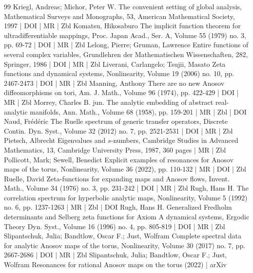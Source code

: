 \documentclass[10pt]{amsart}
\theoremstyle{definition}\newtheorem{defi}[theo]{Definition}\newtheorem{rema}[theo]{Remark}\newtheorem{exam}[theo]{Example}\newtheorem{exem}[theo]{Example}\newtheorem{nota}[theo]{Notation}
\begin{document}
\begin{thebibliography}{99}
 Kriegl, Andreas; Michor, Peter W. The convenient setting of global analysis, Mathematical Surveys and Monographs, 53, American Mathematical Society, 1997 | DOI | MR | Zbl
 Komatsu, Hikosaburo The implicit function theorem for ultradifferentiable mappings, Proc. Japan Acad., Ser. A, Volume 55 (1979) no. 3, pp. 69-72 | DOI | MR | Zbl
 Lelong, Pierre; Gruman, Lawrence Entire functions of several complex variables, Grundlehren der Mathematischen Wissenschaften, 282, Springer, 1986 | DOI | MR | Zbl
 Liverani, Carlangelo; Tsujii, Masato Zeta functions and dynamical systems, Nonlinearity, Volume 19 (2006) no. 10, pp. 2467-2473 | DOI | MR | Zbl
 Manning, Anthony There are no new Anosov diffeomorphisms on tori, Am. J. Math., Volume 96 (1974), pp. 422-429 | DOI | MR | Zbl
 Morrey, Charles B. jun. The analytic embedding of abstract real-analytic manifolds, Ann. Math., Volume 68 (1958), pp. 159-201 | MR | Zbl | DOI
 Naud, Frédéric The Ruelle spectrum of generic transfer operators, Discrete Contin. Dyn. Syst., Volume 32 (2012) no. 7, pp. 2521-2531 | DOI | MR | Zbl
 Pietsch, Albrecht Eigenvalues and $s$-numbers, Cambridge Studies in Advanced Mathematics, 13, Cambridge University Press, 1987, 360 pages | MR | Zbl
 Pollicott, Mark; Sewell, Benedict Explicit examples of resonances for Anosov maps of the torus, Nonlinearity, Volume 36 (2022), pp. 110-132 | MR | DOI | Zbl
 Ruelle, David Zeta-functions for expanding maps and Anosov flows, Invent. Math., Volume 34 (1976) no. 3, pp. 231-242 | DOI | MR | Zbl
 Rugh, Hans H. The correlation spectrum for hyperbolic analytic maps, Nonlinearity, Volume 5 (1992) no. 6, pp. 1237-1263 | MR | Zbl | DOI
 Rugh, Hans H. Generalized Fredholm determinants and Selberg zeta functions for Axiom A dynamical systems, Ergodic Theory Dyn. Syst., Volume 16 (1996) no. 4, pp. 805-819 | DOI | MR | Zbl
 Slipantschuk, Julia; Bandtlow, Oscar F.; Just, Wolfram Complete spectral data for analytic Anosov maps of the torus, Nonlinearity, Volume 30 (2017) no. 7, pp. 2667-2686 | DOI | MR | Zbl
 Slipantschuk, Julia; Bandtlow, Oscar F.; Just, Wolfram Resonances for rational Anosov maps on the torus (2022) | arXiv
\end{thebibliography}
\end{document}
